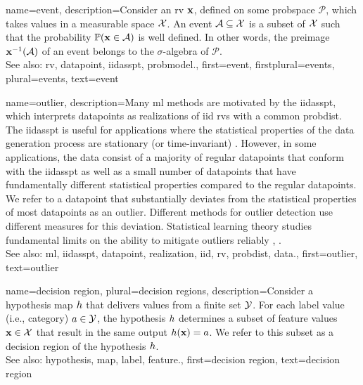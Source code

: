 {name={event}, 
	description={Consider an \gls{rv} ${\bf x}$, defined on some \gls{probspace} $\mathcal{P}$, 
		which takes values in a \gls{measurable} space $\mathcal{X}$. An event $\mathcal{A} \subseteq \mathcal{X}$ 
		is a subset of $\mathcal{X}$ such that the \gls{probability} 
		$\mathbb{P}({{\bf x} \in \mathcal{A}})$ is well defined. In other words, the \gls{preimage} 
		${\bf x}^{-1}(\mathcal{A})$ of an event belongs to the $\sigma$-algebra of $\mathcal{P}$. 
				\\
		See also: \gls{rv}, \gls{datapoint}, \gls{iidasspt}, \gls{probmodel}.},
	first={event},
	firstplural={events},
	plural={events},
	text={event} 
}


{name={outlier}, 
	description={Many \gls{ml} methods 
		are motivated by the \gls{iidasspt}, which interprets \glspl{datapoint} as \glspl{realization} of 
		\gls{iid} \glspl{rv} with a common \gls{probdist}. The \gls{iidasspt} is useful for applications  
		where the statistical properties of the \gls{data} generation process are stationary (or time-invariant) \cite{Brockwell91}. 
		However, in some applications, the \gls{data} consist of a majority of regular \glspl{datapoint} 
		that conform with the \gls{iidasspt} as well as a small number of \glspl{datapoint} that have fundamentally different 
       		statistical properties compared to the regular \glspl{datapoint}. We refer to a \gls{datapoint} that 
        		substantially deviates from the statistical properties of most \glspl{datapoint} as an 
        		outlier. Different methods for outlier detection use different measures for this deviation. 
        		Statistical learning theory studies fundamental limits on the ability to mitigate outliers reliably \cite{doi:10.1137/0222052}, \cite{10.1214/20-AOS1961}.
        		\\
		See also: \gls{ml}, \gls{iidasspt}, \gls{datapoint}, \gls{realization}, \gls{iid}, \gls{rv}, \gls{probdist}, \gls{data}.},
	 first={outlier},
	 text={outlier} 
}

{name={decision region}, plural={decision regions}, 
	description={Consider 
		a \gls{hypothesis} \gls{map} $h$ that delivers values from a finite set $\mathcal{Y}$. 
		For each \gls{label} value (i.e., category) $a \in \mathcal{Y}$, the \gls{hypothesis} $h$ 
		determines a subset of \gls{feature} values ${\bf x} \in \mathcal{X}$ that result 
		in the same output $h({\bf x})=a$. We refer to this subset as a decision 
		region of the \gls{hypothesis} $h$.
				\\
		See also: \gls{hypothesis}, \gls{map}, \gls{label}, \gls{feature}.},
	first={decision region},
	text={decision region} 
}


